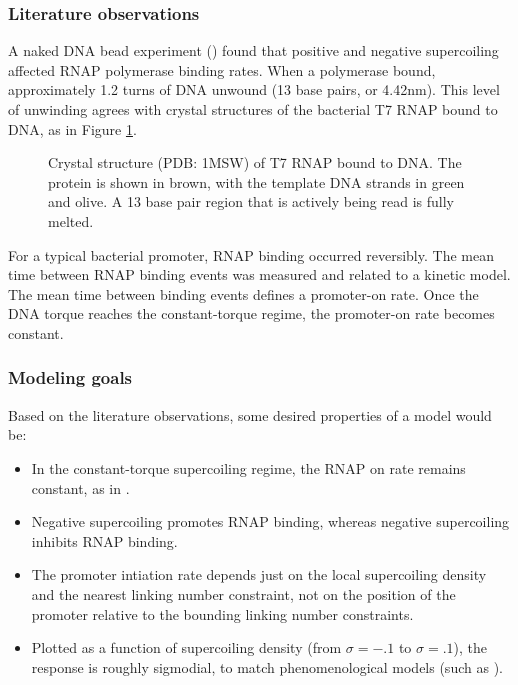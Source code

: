 \documentclass[11pt]{article}
\begin{document}
\subsubsection{Literature observations}
A naked DNA bead experiment (\textcite{revyakinPromoterUnwindingPromoter2004}) found that positive and negative supercoiling affected RNAP polymerase binding rates. When a polymerase bound, approximately 1.2 turns of DNA unwound (13 base pairs, or 4.42nm). This level of unwinding agrees with crystal structures of the bacterial T7 RNAP bound to DNA, as in Figure \ref{fig:rnap_bound}.

\begin{figure}[h]
    \centering
    \caption{Crystal structure (PDB: 1MSW) of T7 RNAP bound to DNA. The protein is shown in brown, with the template DNA strands in green and olive.
             A 13 base pair region that is actively being read is fully melted.}
    \label{fig:rnap_bound}
\end{figure}

For a typical bacterial promoter, RNAP binding occurred reversibly. The mean time between RNAP binding events was measured and related to a kinetic model. The mean time between binding events defines a promoter-on rate. Once the DNA torque reaches the constant-torque regime, the promoter-on rate becomes constant.

\subsubsection{Modeling goals}
Based on the literature observations, some desired properties of a model would be:
\begin{itemize}
    \item In the constant-torque supercoiling regime, the RNAP on rate remains constant, as in \textcite{revyakinPromoterUnwindingPromoter2004}.
    \item Negative supercoiling promotes RNAP binding, whereas negative supercoiling inhibits RNAP binding.
    \item The promoter intiation rate depends just on the local supercoiling density and the nearest linking number constraint, not on the position of the promoter relative to the bounding linking number constraints.
    \item Plotted as a function of supercoiling density (from \(\sigma = -.1\) to \(\sigma = .1\)), the response is roughly sigmodial, to match phenomenological models (such as \textcite{elhoudaiguiBacterialGenomeArchitecture2019a}).
\end{itemize}
\end{document}
